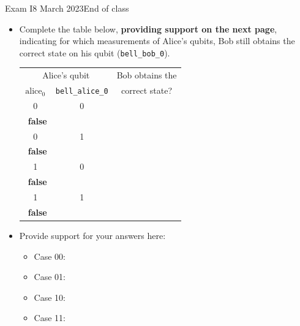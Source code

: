 \documentclass[12pt]{article}
\def\Obox#1{\Ovalbox{\hbox to 1ex{\vrule width 0pt height 1ex\hss #1\hss}}}
\def\TFMarked#1#2{\ \stackbox[l][m]{\Obox{#1}~\textbf{true}\\\Obox{#2}~\textbf{false}}}
\def\TF{\TFMarked{\relax}{\relax}}
\begin{document}
\begin{assignment}{Exam I}{8 March 2023}{End of class}
\begin{enumerate}
\begin{itemize}
    \item{}
Complete the table below, \textbf{providing support on the next page}, indicating for which measurements of Alice's qubits, Bob still obtains the correct state on his qubit (\texttt{bell\_bob\_0}).
\begin{center}\Large
\begin{tabular}{ccc}
\multicolumn{2}{c}{Alice's qubit} & Bob obtains the  \\
\texttt{$\mbox{alice}_0$} & \texttt{bell\_alice\_0} & correct state?\\[1em]
0 & 0 & \TF \\[2em]
0 & 1 & \TF \\[2em] 
1 & 0 & \TF \\[2em]
1 & 1 & \TF \\
\end{tabular}
\end{center}
\Continued{}
\item {} Provide support for your answers here:
\begin{itemize}
    \item {} Case 00:
    \LeaveSpace{1.5in}
   \item {} Case 01:
    \LeaveSpace{1.5in}
       \item {} Case 10:
    \LeaveSpace{1.5in}
       \item {} Case 11:
    \LeaveSpace{1.5in}
\end{itemize}
\end{itemize}

\end{enumerate}

\end{assignment}
\Bpage{}
\end{document}
